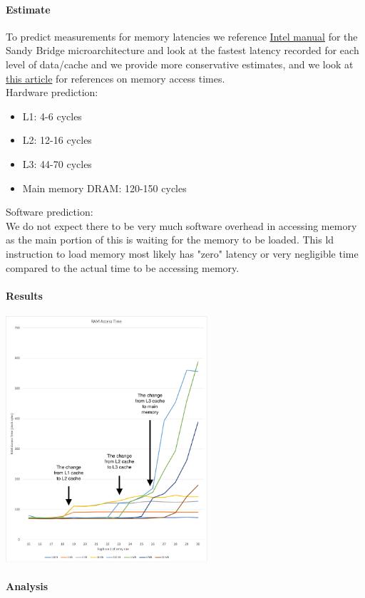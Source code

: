 \paragraph{Estimate}
To predict measurements for memory latencies we reference \href{https://www.intel.com/content/dam/www/public/us/en/documents/manuals/64-ia-32-architectures-optimization-manual.pdf}{Intel manual} for the Sandy Bridge microarchitecture and look at the fastest latency recorded for each level of data/cache and we provide more conservative estimates, and we look at \href{http://norvig.com/21-days.html#answers}{this article} for references on memory access times.\\
Hardware prediction:
\begin{itemize}
    \item L1: 4-6 cycles
    \item L2: 12-16 cycles
    \item L3: 44-70 cycles
    \item Main memory DRAM: 120-150 cycles
\end{itemize}
Software prediction:\\
We do not expect there to be very much software overhead in accessing memory as the main portion of this is waiting for the memory to be loaded. This ld instruction to load memory most likely has "zero" latency or very negligible time compared to the actual time to be accessing memory. 
\paragraph{Results}
\includegraphics[width=7.5cm]{ram_access_time.png}

\paragraph{Analysis}

